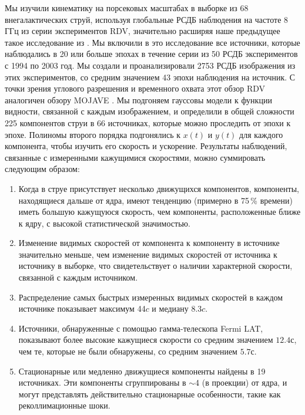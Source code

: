 Мы изучили кинематику на порсековых масштабах в выборке из 68 внегалактических струй, используя
глобальные РСДБ наблюдения на частоте 8 ГГц из серии экспериментов RDV, значительно расширяя наше
предыдущее такое исследование из \cite{Piner_2007}. Мы включили в это исследование все источники,
которые наблюдались в 20 или больше эпохах в течение серии из 50 РСДБ экспериментов с 1994 по
2003 год. Мы создали и проанализировали 2753 РСДБ изображения из этих экспериментов, со средним
значением 43 эпохи наблюдения на источник. С точки зрения углового разрешения и временного охвата
этот обзор RDV аналогичен обзору MOJAVE \cite{Lister_2009b,Homan_2009}. Мы подгоняем гауссовы
модели к функции видности, связанной с каждым изображением, и определили в общей сложности 225
компонентов струи в 66 источниках, которые можно проследить от эпохи к эпохе. Полиномы второго
порядка подгонялись к $x(t)$ и $y(t)$ для каждого компонента, чтобы изучить его скорость и
ускорение. Результаты наблюдений, связанные с измеренными кажущимися скоростями, можно суммировать
следующим образом:
\begin{enumerate}
 \item
 Когда в струе присутствует несколько движущихся компонентов, компоненты, находящиеся дальше от
ядра, имеют тенденцию (примерно в 75\,\% времени) иметь большую кажущуюся скорость, чем компоненты,
расположенные ближе к ядру, с высокой статистической значимостью.

\item
 Изменение видимых скоростей от компонента к компоненту в источнике значительно меньше, чем
изменение видимых скоростей от источника к источнику в выборке, что свидетельствует о наличии
характерной скорости, связанной с каждым источником.

\item
Распределение самых быстрых измеренных видимых скоростей в каждом источнике показывает максимум
44$c$ и медиану 8.3$c$.

\item
Источники, обнаруженные с помощью гамма-телескопа Fermi LAT, показывают более высокие кажущиеся
скорости со средним значением $12.4с$, чем те, которые не были обнаружены, со средним значением
$5.7с$.

\item
Стационарные или медленно движущиеся компоненты найдены в 19 источниках. Эти компоненты
сгруппированы в $\sim$\SI{4}{\parsec} (в проекции) от ядра, и могут представлять действительно
стационарные особенности, такие как реколлимационные шоки.
\end{enumerate}

